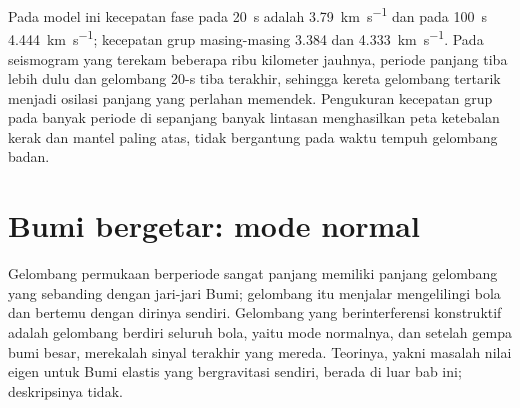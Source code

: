 Pada model ini kecepatan fase pada \qty{20}{s} adalah \qty{3.79}{km.s^{-1}} dan pada
\qty{100}{s} \qty{4.444}{km.s^{-1}}; kecepatan grup masing-masing 3.384 dan
\qty{4.333}{km.s^{-1}}. Pada seismogram yang terekam beberapa ribu kilometer
jauhnya, periode panjang tiba lebih dulu dan gelombang 20-s tiba terakhir, sehingga
kereta gelombang tertarik menjadi osilasi panjang yang perlahan memendek. Pengukuran
kecepatan grup pada banyak periode di sepanjang banyak lintasan menghasilkan peta ketebalan kerak
dan mantel paling atas, tidak bergantung pada
waktu tempuh gelombang badan.

\section{Bumi bergetar: mode normal}

Gelombang permukaan berperiode sangat panjang memiliki panjang gelombang yang sebanding dengan
jari-jari Bumi; gelombang itu menjalar mengelilingi bola dan bertemu dengan dirinya sendiri. Gelombang yang
berinterferensi konstruktif adalah gelombang berdiri seluruh bola, yaitu mode
normalnya, dan setelah gempa bumi besar, merekalah sinyal terakhir yang mereda.
Teorinya, yakni masalah nilai eigen untuk Bumi elastis yang bergravitasi sendiri, berada
di luar bab ini; deskripsinya tidak.

